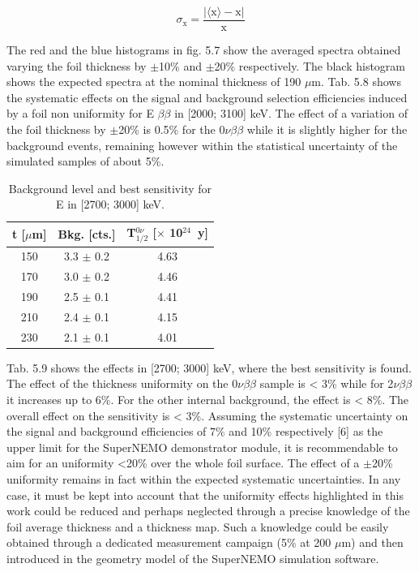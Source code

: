 \documentclass[main.tex]{subfiles}
\begin{document}
\begin{equation}
\sigma_\text{x} = \frac{|\langle \text{x}\rangle - \text{x}|}{\text{x}}
\end{equation}


\bigskip


\NI The red and the blue histograms in fig. 5.7 show the averaged spectra obtained varying the foil thickness by $\pm$10\% and $\pm$20\% respectively. The black histogram shows the expected spectra at the nominal thickness of 190 $\mu$m. Tab. 5.8 shows the systematic effects on the signal and background selection efficiencies induced by a foil non uniformity for E $\beta\beta$ in [2000; 3100] keV. The effect of a variation of the foil thickness by $\pm$20\% is 0.5\% for the 0$\nu\beta\beta$ while it is slightly higher for the background events, remaining however within the statistical uncertainty of the simulated samples of about 5\%.


\begin{table}
\centering
\begin{tabular}{c|c|c}
\toprule
t [$\mu$m] & Bkg. [cts.] &  T$_{\text{1/2}}^{\text{0}\nu}$ [$\times$ 10$^{\text{24}}$~y] \\[0.1cm]
\hline
150 & 3.3 $\pm$ 0.2 & 4.63 \\[0.1cm]
170 & 3.0 $\pm$ 0.2 & 4.46 \\[0.1cm]
190 & 2.5 $\pm$ 0.1 & 4.41 \\[0.1cm]
210 & 2.4 $\pm$ 0.1 & 4.15 \\[0.1cm]
230 & 2.1 $\pm$ 0.1 & 4.01 \\[0.1cm]
\bottomrule
\end{tabular}
\caption{Background level and best sensitivity for E in [2700; 3000] keV.}
\label{Tab:ThicknessInfluence}
\end{table}


\bigskip


\NI Tab. 5.9 shows the effects in [2700; 3000] keV, where the best sensitivity is found. The effect of the thickness uniformity on the 0$\nu\beta\beta$ sample is < 3\% while for 2$\nu\beta\beta$ it increases up to 6\%. For the other internal background, the effect is < 8\%. The overall effect on the sensitivity is < 3\%. Assuming the systematic uncertainty on the signal and background efficiencies of 7\% and 10\% respectively [6] as the upper limit for the SuperNEMO demonstrator module, it is recommendable to aim for an uniformity <20\% over the whole foil surface. The effect of a $\pm$20\% uniformity remains in fact within the expected systematic uncertainties. In any case, it must be kept into account that the uniformity effects highlighted in this work could be reduced and perhaps neglected through a precise knowledge of the foil average thickness and a thickness map. Such a knowledge could be easily obtained through a dedicated measurement campaign (5\% at 200 $\mu$m) and then introduced in the geometry model of the SuperNEMO simulation software.
\end{document}
